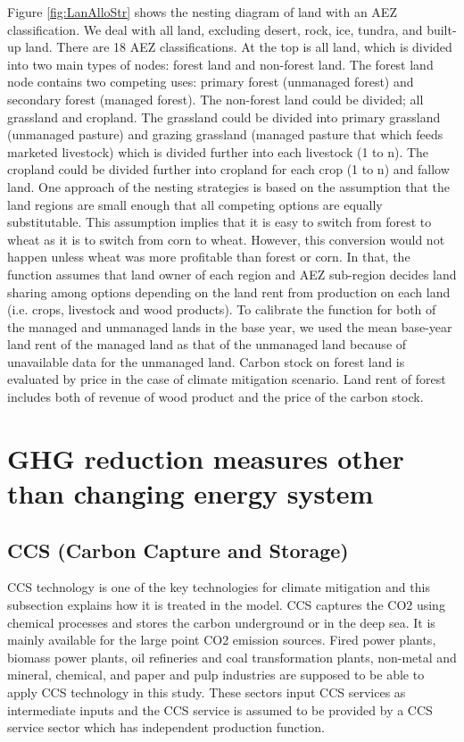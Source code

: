 \documentclass[10pt,a4paper,titlepage,dvipdfmx]{book}
\begin{document}
Figure \ref{fig:LanAlloStr} shows the nesting diagram of land with an AEZ classification. We deal with all land, excluding desert, rock, ice, tundra, and built-up land. There are 18 AEZ classifications. At the top is all land, which is divided into two main types of nodes: forest land and non-forest land. The forest land node contains two competing uses: primary forest (unmanaged forest) and secondary forest (managed forest). The non-forest land could be divided; all grassland and cropland. The grassland could be divided into primary grassland (unmanaged pasture) and grazing grassland (managed pasture that which feeds marketed livestock) which is divided further into each livestock (1 to n). The cropland could be divided further into cropland for each crop (1 to n) and fallow land. One approach of the nesting strategies is based on the assumption that the land regions are small enough that all competing options are equally substitutable. This assumption implies that it is easy to switch from forest to wheat as it is to switch from corn to wheat. However, this conversion would not happen unless wheat was more profitable than forest or corn. In that, the function assumes that land owner of each region and AEZ sub-region decides land sharing among options depending on the land rent from production on each land (i.e. crops, livestock and wood products). To calibrate the function for both of the managed and unmanaged lands in the base year, we used the mean base-year land rent of the managed land as that of the unmanaged land because of unavailable data for the unmanaged land. Carbon stock on forest land is evaluated by price in the case of climate mitigation scenario. Land rent of forest includes both of revenue of wood product and the price of the carbon stock.

\section{\label{sec:GHGRedMeaOthThanCHaEneSys}{GHG reduction measures other than changing energy system}}

\subsection{\label{subsec:CCS}{CCS (Carbon Capture and Storage)}}

CCS technology is one of the key technologies for climate mitigation and this subsection explains how it is treated in the model. CCS captures the CO2 using chemical processes and stores the carbon underground or in the deep sea. It is mainly available for the large point CO2 emission sources. Fired power plants, biomass power plants, oil refineries and coal transformation plants, non-metal and mineral, chemical, and paper and pulp industries are supposed to be able to apply CCS technology in this study. These sectors input CCS services as intermediate inputs and the CCS service is assumed to be provided by a CCS service sector which has independent production function.
\end{document}
